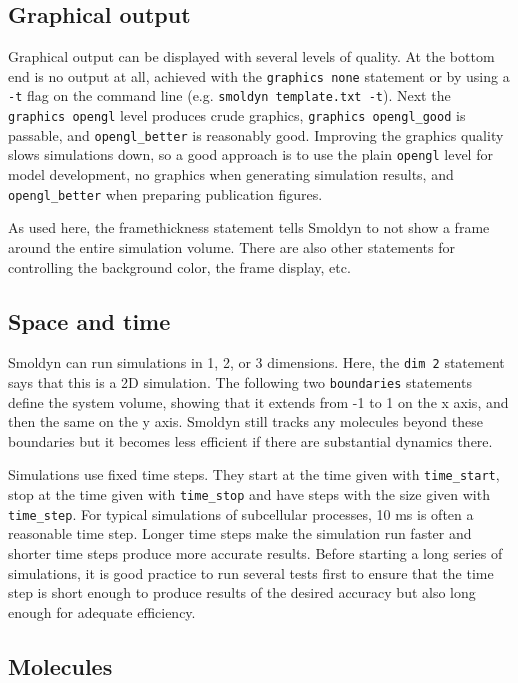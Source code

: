 \documentclass {book}
\newcommand {\ttt} {\texttt}
\begin{document}
\subsection*{Graphical output}

Graphical output can be displayed with several levels of quality. At the bottom end is no output at all, achieved with the  \ttt{graphics none} statement or by using a  \ttt{-t} flag on the command line (e.g.  \ttt{smoldyn template.txt -t}). Next the  \ttt{graphics opengl} level produces crude graphics,  \ttt{graphics opengl\_good} is passable, and  \ttt{opengl\_better} is reasonably good. Improving the graphics quality slows simulations down, so a good approach is to use the plain  \ttt{opengl} level for model development, no graphics when generating simulation results, and  \ttt{opengl\_better} when preparing publication figures.

As used here, the framethickness statement tells Smoldyn to not show a frame around the entire simulation volume. There are also other statements for controlling the background color, the frame display, etc.

\subsection*{Space and time}

Smoldyn can run simulations in 1, 2, or 3 dimensions. Here, the  \ttt{dim 2} statement says that this is a 2D simulation. The following two  \ttt{boundaries} statements define the system volume, showing that it extends from -1 to 1 on the x axis, and then the same on the y axis. Smoldyn still tracks any molecules beyond these boundaries but it becomes less efficient if there are substantial dynamics there.

Simulations use fixed time steps. They start at the time given with  \ttt{time\_start}, stop at the time given with  \ttt{time\_stop} and have steps with the size given with  \ttt{time\_step}. For typical simulations of subcellular processes, 10 ms is often a reasonable time step. Longer time steps make the simulation run faster and shorter time steps produce more accurate results. Before starting a long series of simulations, it is good practice to run several tests first to ensure that the time step is short enough to produce results of the desired accuracy but also long enough for adequate efficiency.

\subsection*{Molecules}
\end{document}
